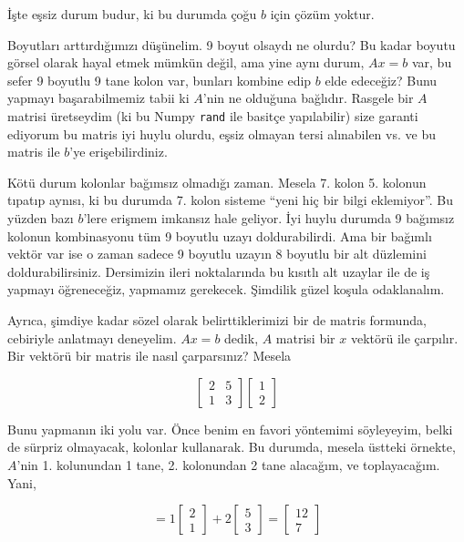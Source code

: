 \documentclass[12pt,fleqn]{article}\usepackage{../../common}
\begin{document}
İşte eşsiz durum budur, ki bu durumda çoğu $b$ için çözüm yoktur.

Boyutları arttırdığımızı düşünelim. 9 boyut olsaydı ne olurdu? Bu kadar
boyutu görsel olarak hayal etmek mümkün değil, ama yine aynı durum, $Ax=b$
var, bu sefer 9 boyutlu 9 tane kolon var, bunları kombine edip $b$ elde
edeceğiz? Bunu yapmayı başarabilmemiz tabii ki $A$'nin ne olduğuna
bağlıdır. Rasgele bir $A$ matrisi üretseydim (ki bu Numpy \verb!rand! ile
basitçe yapılabilir) size garanti ediyorum bu matris iyi huylu olurdu,
eşsiz olmayan tersi alınabilen vs. ve bu matris ile $b$'ye
erişebilirdiniz. 

Kötü durum kolonlar bağımsız olmadığı zaman. Mesela 7. kolon 5. kolonun
tıpatıp aynısı, ki bu durumda 7. kolon sisteme ``yeni hiç bir bilgi
eklemiyor''. Bu yüzden bazı $b$'lere erişmem imkansız hale geliyor. İyi
huylu durumda 9 bağımsız kolonun kombinasyonu tüm 9 boyutlu uzayı
doldurabilirdi. Ama bir bağımlı vektör var ise o zaman sadece 9 boyutlu
uzayın 8 boyutlu bir alt düzlemini doldurabilirsiniz. Dersimizin ileri
noktalarında bu kısıtlı alt uzaylar ile de iş yapmayı öğreneceğiz, yapmamız
gerekecek. Şimdilik güzel koşula odaklanalım.  

Ayrıca, şimdiye kadar sözel olarak belirttiklerimizi bir de matris
formunda, cebiriyle anlatmayı deneyelim. $Ax=b$ dedik, $A$ matrisi bir $x$
vektörü ile çarpılır. Bir vektörü bir matris ile nasıl çarparsınız? Mesela

$$ 
\left[\begin{array}{rr}
2 & 5 \\
1 & 3
\end{array}\right]
\left[\begin{array}{r}
1 \\
2
\end{array}\right]
 $$

Bunu yapmanın iki yolu var. Önce benim en favori yöntemimi söyleyeyim,
belki de sürpriz olmayacak, kolonlar kullanarak. Bu durumda, mesela üstteki
örnekte, $A$'nin 1. kolunundan 1 tane, 2. kolonundan 2 tane alacağım, ve
toplayacağım. Yani,

$$ =
1
\left[\begin{array}{r}
2 \\
1
\end{array}\right]
+
2
\left[\begin{array}{r}
5 \\
3
\end{array}\right]
=
\left[\begin{array}{r}
12 \\
7
\end{array}\right]
 $$
\end{document}
